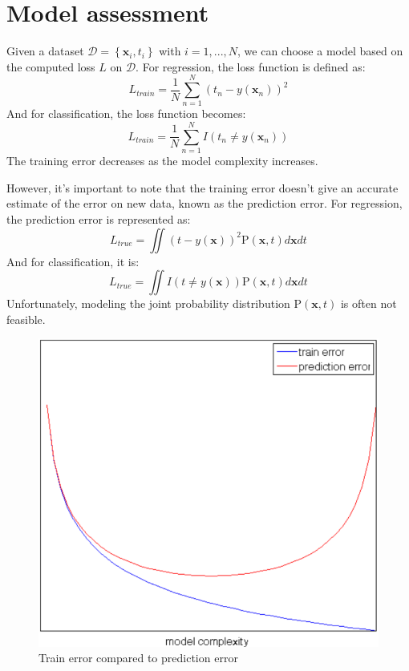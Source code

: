 \section{Model assessment}

Given a dataset $\mathcal{D}=\left\{ \textbf{x}_i,t_i \right\}$ with $i=1,..., N$, we can choose a model based on the computed loss $L$ on $\mathcal{D}$.
For regression, the loss function is defined as:
\[L_{train}=\dfrac{1}{N}\sum_{n=1}^N\left(t_n-y(\textbf{x}_n)\right)^2\]
And for classification, the loss function becomes:
\[L_{train}=\dfrac{1}{N}\sum_{n=1}^NI(t_n \neq y(\textbf{x}_n))\]
The training error decreases as the model complexity increases.

However, it's important to note that the training error doesn't give an accurate estimate of the error on new data, known as the prediction error.
For regression, the prediction error is represented as:
\[L_{true}=\iint\left( t-y(\textbf{x})\right)^2\text{P}(\textbf{x},t)d\textbf{x}dt \]
And for classification, it is:
\[L_{true}=\iint I(t\neq y(\textbf{x}))\text{P}(\textbf{x},t)d\textbf{x}dt \]
Unfortunately, modeling the joint probability distribution $\text{P}(\textbf{x},t)$ is often not feasible.
\begin{figure}[H]
    \centering
    \includegraphics[width=0.35\linewidth]{images/error.png}
    \caption{Train error compared to prediction error}
\end{figure}

